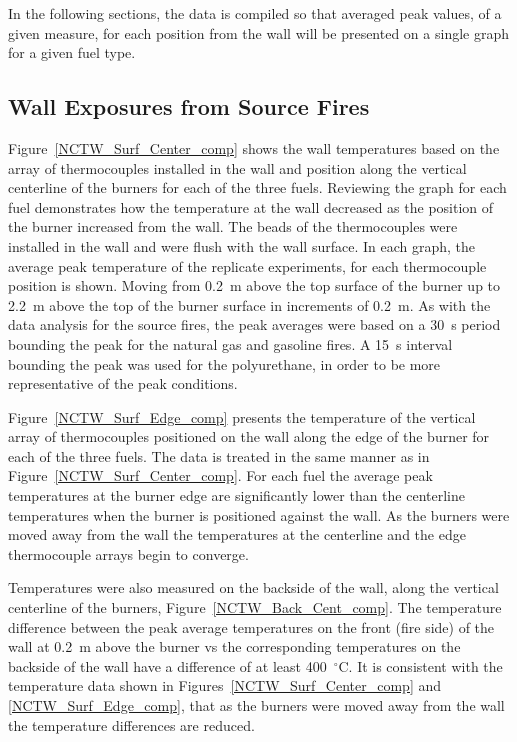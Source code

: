 \documentclass[twoside]{uocthesis}
\begin{document}
{In the following sections, the data is compiled so that averaged peak values, of a given measure, for each position from the wall will be presented on a single graph for a given fuel type.

\subsection{Wall Exposures from Source Fires}

Figure~\ref{NCTW_Surf_Center_comp} shows the wall temperatures based on the array of thermocouples installed in the wall and position along the vertical centerline of the burners for each of the three fuels. Reviewing the graph for each fuel demonstrates how the temperature at the wall decreased as the position of the burner increased from the wall. The beads of the thermocouples were installed in the wall and were flush with the wall surface. In each graph, the average peak temperature of the replicate experiments, for each thermocouple position is shown. Moving from 0.2~m above the top surface of the burner up to 2.2~m above the top of the burner surface in increments of 0.2~m. As with the data analysis for the source fires, the peak averages were based on a 30~s period bounding the peak for the natural gas and gasoline fires.  A 15~s interval bounding the peak was used for the polyurethane, in order to be more representative of the peak conditions.

Figure~\ref{NCTW_Surf_Edge_comp} presents the temperature of the vertical array of thermocouples positioned on the wall along the edge of the burner for each of the three fuels.  The data is treated in the same manner as in Figure~\ref{NCTW_Surf_Center_comp}.  For each fuel the average peak temperatures at the burner edge are significantly lower than the centerline temperatures when the burner is positioned against the wall.  As the burners were moved away from the wall the temperatures at the centerline and the edge thermocouple arrays begin to converge.

Temperatures were also measured on the backside of the wall, along the vertical centerline of the burners, Figure~\ref{NCTW_Back_Cent_comp}. The temperature difference between the peak average temperatures on the front (fire side) of the wall at 0.2~m above the burner vs the corresponding temperatures on the backside of the wall have a difference of at least 400~$^\circ$C.  It is consistent with the temperature data shown in Figures~\ref{NCTW_Surf_Center_comp} and \ref{NCTW_Surf_Edge_comp}, that as the burners were moved away from the wall the temperature differences are reduced.

}
\end{document}
